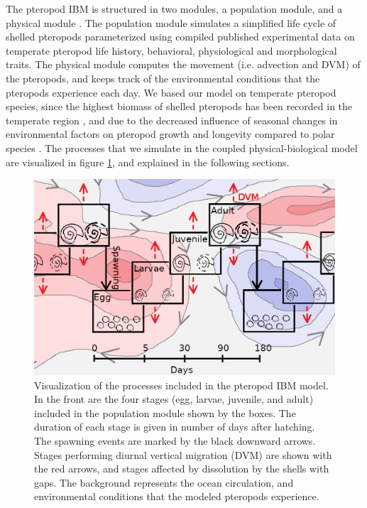 
The pteropod IBM is structured in two modules, a population module, and a physical module \citep[similar to ][]{Miller1998CalanusIBM}. The population module simulates a simplified life cycle of shelled pteropods parameterized using compiled published experimental data on temperate pteropod life history, behavioral, physiological and morphological traits. The physical module computes the movement (i.e. advection and DVM) of the pteropods, and keeps track of the environmental conditions that the pteropods experience each day.  We based our model on temperate pteropod species, since the highest biomass of shelled pteropods has been recorded in the temperate region \citep{Bednarsek2012PteropodDistribution}, and due to the decreased influence of seasonal changes in environmental factors \citep[e.g. temperature and food availability; ][]{Bednarsek2012PteropodDistribution,Wang2017Lifecycle} on pteropod growth and longevity compared to polar species \citep{Manno2017ReviewPteropodVulnerability}. The processes that we simulate in the coupled physical-biological model are visualized in figure \ref{fig:model_visualization}, and explained in the following sections.




\begin{figure}[tbh!]
    \centering
    
        \includegraphics[scale=0.5]{images/model_visualization_sketch_with_circulation.png}
       
    
    \caption{Visualization of the processes included in the pteropod IBM model. In the front are the four stages (egg, larvae, juvenile, and adult) included in the population module shown by the boxes. The duration of each stage is given in number of days after hatching. The spawning events are marked by the black downward arrows. Stages performing diurnal vertical migration (DVM) are shown with the red arrows, and stages affected by dissolution by the shells with gaps. The background represents the ocean circulation, and environmental conditions that the modeled pteropods experience.}
    \label{fig:model_visualization}
\end{figure}


